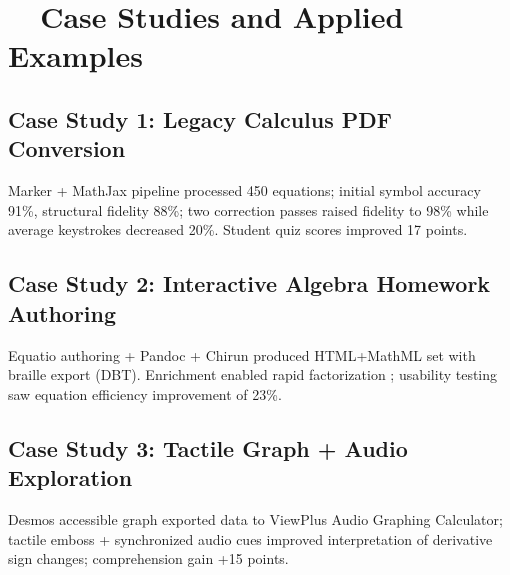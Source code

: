 \section{~~Case Studies and Applied Examples}\label{ch11:sec:case-studies}

\subsection{Case Study 1: Legacy Calculus PDF Conversion}
Marker + MathJax pipeline processed 450 equations; initial symbol accuracy 91\%, structural fidelity 88\%; two correction passes raised fidelity to 98\% while average  keystrokes decreased 20\%. Student quiz scores improved 17 points.\supercite{Marker, MathJaxDocs}

\subsection{Case Study 2: Interactive Algebra Homework Authoring}
Equatio authoring + Pandoc + Chirun produced HTML+MathML set with braille export (DBT). Enrichment enabled rapid factorization ; usability testing saw equation  efficiency improvement of 23\%.\supercite{Equatio, Chirun, DuxburyDBT}

\subsection{Case Study 3: Tactile Graph + Audio Exploration}
Desmos accessible graph exported data to ViewPlus Audio Graphing Calculator; tactile emboss + synchronized audio cues improved interpretation of derivative sign changes; comprehension gain +15 points.\supercite{DesmosAccessibility, ViewPlusAGC}

